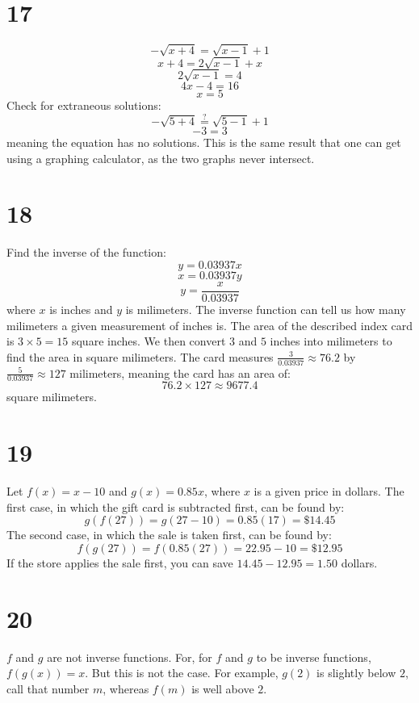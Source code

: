 \documentclass{article}
\theoremstyle{definition}
\newcommand{\?}{\stackrel{?}{=}}
\begin{document}
\section*{17}
\[ -\sqrt{x+4}=\sqrt{x-1}+1 \] \[ x+4=2\sqrt{x-1}+x \] \[ 2\sqrt{x-1}=4 \] \[ 4x-4=16 \] \[ x=5 \]
Check for extraneous solutions:
\[ -\sqrt{5+4}\? \sqrt{5-1}+1 \] \[ -3=3 \] meaning the equation has no solutions. This is the same result that one can get using a 
graphing calculator, as the two graphs never intersect.

\section*{18}
Find the inverse of the function:
\[ y=0.03937x \] \[ x=0.03937y \] \[ y=\frac{x}{0.03937} \] where $x$ is inches and $y$ is milimeters. The inverse function can tell us how many 
milimeters a given measurement of inches is. The area of the described index card is $3\times 5=15$ square inches. We then convert 
$3$ and $5$ inches into milimeters to find the area in square milimeters. The card measures $\frac{3}{0.03937}\approx 76.2$ by 
$\frac{5}{0.03937}\approx 127$ milimeters, meaning the card has an area of:
\[ 76.2\times 127\approx 9677.4 \] square milimeters. 

\section*{19}
Let $f(x)=x-10$ and $g(x)=0.85x$, where $x$ is a given price in dollars. The first case, in which the gift card is subtracted first, can be found by:
\[ g(f(27))=g(27-10)=0.85(17)=\$14.45 \] The second case, in which the sale is taken first, can be found by:
\[ f(g(27))=f(0.85(27))=22.95-10=\$12.95 \] If the store applies the sale first, you can save $14.45-12.95=1.50$ dollars. 

\section*{20}
$f$ and $g$ are not inverse functions. For, for $f$ and $g$ to be inverse functions, $f(g(x))=x$. But this is not the case. For example, 
$g(2)$ is slightly below $2$, call that number $m$, whereas $f(m)$ is well above $2$.
\end{document}
